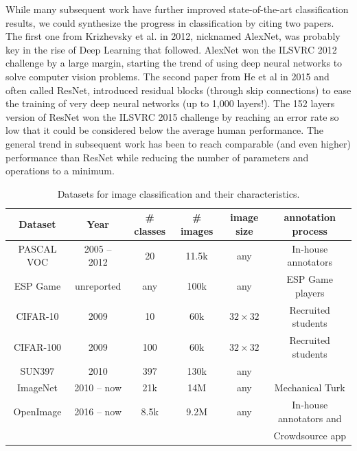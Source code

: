 While many subsequent work have further improved state-of-the-art classification results, we could synthesize the progress in classification by citing two papers. The first one from Krizhevsky et al. in 2012, nicknamed AlexNet, was probably key in the rise of Deep Learning that followed. AlexNet won the ILSVRC 2012 challenge by a large margin, starting the trend of using deep neural networks to solve computer vision problems. The second paper from He et al in 2015 and often called ResNet, introduced residual blocks (through skip connections) to ease the training of very deep neural networks (up to 1,000 layers!). The 152 layers version of ResNet won the ILSVRC 2015 challenge by reaching an error rate so low that it could be considered below the average human performance. The general trend in subsequent work has been to reach comparable (and even higher) performance than ResNet while reducing the number of parameters and operations to a minimum.  

\vspace{0.5cm}
\begin{table}
	\centering
	\caption{Datasets for image classification and their characteristics.}
	\begin{tabular}{|c|c|c|c|c|c|}
		\hline
		Dataset & Year & \# classes & \# images & image size & annotation process \\
		\hline
		PASCAL VOC \cite{Everingham10} & 2005 -- 2012 & 20 & 11.5k & any & In-house annotators \\
		ESP Game \cite{von2005esp} & unreported & any & 100k & any & ESP Game players \\
		CIFAR-10 \cite{krizhevsky2009learning} & 2009 & 10 & 60k & $32 \times 32$ & Recruited students \\
		CIFAR-100 \cite{krizhevsky2009learning} & 2009 & 100 & 60k & $32 \times 32$ & Recruited students \\
		SUN397 \cite{xiao2010sun} & 2010 & 397 & 130k & any &  \\
		ImageNet \cite{ILSVRC15} & 2010 -- now & 21k & 14M & any & Mechanical Turk \\
		OpenImage \cite{OpenImages, OpenImages2} & 2016 -- now & 8.5k & 9.2M & any & In-house annotators and \\
& & & & & Crowdsource app\\
		\hline
	\end{tabular}
	\label{tab:classification_ds}
\end{table}
\vspace{0.5cm}

